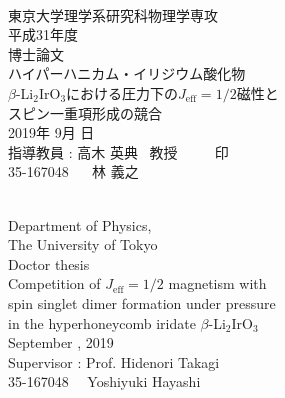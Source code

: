 \documentclass[11pt,a4paper]{report}
\begin{document}
\begin{titlepage}
\begin{center}
~\\
\vspace{40truept}
{\LARGE 東京大学理学系研究科物理学専攻}\\
\vspace{20truept}
{\LARGE 平成31年度}\\
\vspace{20truept}
{\LARGE 博士論文}\\
\vspace{60truept}
{\Huge ハイパーハニカム・イリジウム酸化物}\\
\vspace{7truept}
{\Huge $\beta$-Li$_2$IrO$_3$における圧力下の$J_\mathrm{eff} = 1/2$磁性と}\\
\vspace{7truept}
{\Huge スピン一重項形成の競合}\\
\vspace{100truept}
{\LARGE 2019年 9月 日}\\
\vspace{20truept}
{\LARGE 指導教員 : 高木 英典 ~教授 ~~~~ 印}\\
\vspace{50truept}
{\LARGE 35-167048 ~~ 林 義之}
\end{center}
\end{titlepage}

\begin{titlepage}
\begin{center}
~\\
\vspace{40truept}
{\LARGE Department of Physics,}\\
\vspace{20truept}
{\LARGE  The University of Tokyo}\\
\vspace{20truept}
{\LARGE Doctor thesis}\\
\vspace{60truept}
{\Huge Competition of $J_\mathrm{eff} = 1/2$ magnetism with}\\
\vspace{7truept}
{\Huge spin singlet dimer formation under pressure}\\
\vspace{7truept}
{\Huge in the hyperhoneycomb iridate $\beta$-Li$_2$IrO$_3$}\\
\vspace{100truept}
{\LARGE September , 2019}\\
\vspace{20truept}
{\LARGE Supervisor : Prof. Hidenori Takagi}\\
\vspace{50truept}
{\LARGE 35-167048 ~~Yoshiyuki Hayashi}
\end{center}
\end{titlepage}
\end{document}
